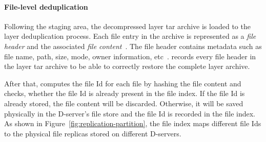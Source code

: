 %

%
\paragraph{File-level deduplication}
%
Following the staging area, 
the decompressed layer tar archive is loaded to the layer deduplication process.
Each file entry in the archive is represented as a \emph{file header} and the associated
\emph{file content}~\cite{xxx}\todo{ }.
The file header contains metadata such as file name, path, size, mode, owner information, etc~\cite{xxx}\todo{ }.
%
%
\sysname records every file header in the layer tar archive
to be able to correctly restore the complete layer archive.
%

After that, \sysname computes the file Id for each file by hashing the file content and 
checks, whether the file Id is already present in the file index.
If the file Id is already stored, the file content will be discarded. 
Otherwise, it will be saved physically in the D-server's file store and 
the file Id is recorded in the file index. As shown in Figure~\ref{fig:replication-partition},
the file index maps different file Ids to the physical file replicas stored
on different D-servers.


